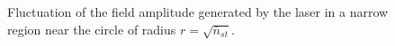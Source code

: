 \begin{figure}
\centering

\caption{Fluctuation of the field amplitude generated by the laser in a narrow
  region near the circle of radius $r=\sqrt{\bar{n}_{st}}$.}
\label{figPart2Ch1_7}
\end{figure}